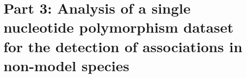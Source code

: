 
\section[Part 3]{Part 3: Analysis of a single nucleotide polymorphism
dataset for the detection of associations in non-model species}

